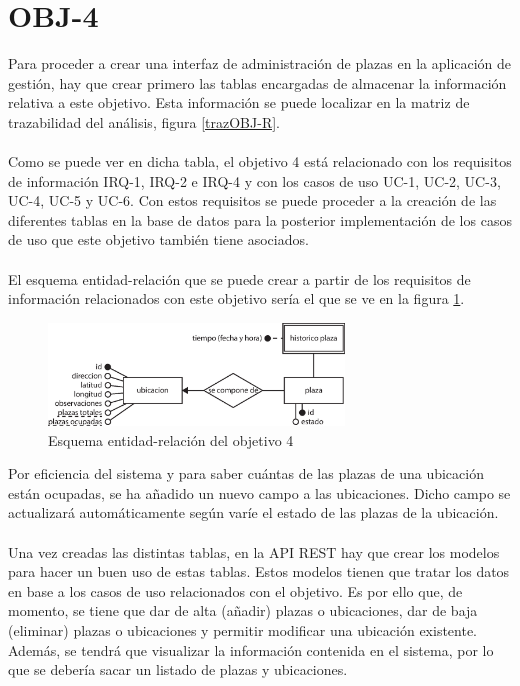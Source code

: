 \section{OBJ-4}
Para proceder a crear una interfaz de administración de plazas en la aplicación de gestión, hay que crear primero las tablas encargadas de almacenar la información relativa a este objetivo. Esta información se puede localizar en la matriz de trazabilidad del análisis, figura \ref{trazOBJ-R}.
\\\\
Como se puede ver en dicha tabla, el objetivo 4 está relacionado con los requisitos de información IRQ-1, IRQ-2 e IRQ-4 y con los casos de uso UC-1, UC-2, UC-3, UC-4, UC-5 y UC-6. Con estos requisitos se puede proceder a la creación de las diferentes tablas en la base de datos para la posterior implementación de los casos de uso que este objetivo también tiene asociados.
\\\\
El esquema entidad-relación que se puede crear a partir de los requisitos de información relacionados con este objetivo sería el que se ve en la figura \ref{er_objetivo_4}.
\begin{figure}[H]
	\centering
	\includegraphics[width=0.7\textwidth]{imagenes/er_objetivo_4.eps}
	\caption{Esquema entidad-relación del objetivo 4}
	\label{er_objetivo_4}
\end{figure}
Por eficiencia del sistema y para saber cuántas de las plazas de una ubicación están ocupadas, se ha añadido un nuevo campo a las ubicaciones. Dicho campo se actualizará automáticamente según varíe el estado de las plazas de la ubicación.
\\\\
Una vez creadas las distintas tablas, en la API REST hay que crear los modelos para hacer un buen uso de estas tablas. Estos modelos tienen que tratar los datos en base a los casos de uso relacionados con el objetivo. Es por ello que, de momento, se tiene que dar de alta (añadir) plazas o ubicaciones, dar de baja (eliminar) plazas o ubicaciones y permitir modificar una ubicación existente. Además, se tendrá que visualizar la información contenida en el sistema, por lo que se debería sacar un listado de plazas y ubicaciones.
